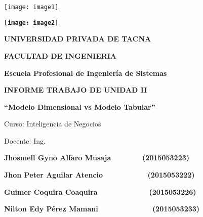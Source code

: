 \documentclass{article} %
\begin{document}


\noindent 

\noindent 

\noindent 

\noindent 

\texttt{[image: image1]}

 


\noindent \textbf{}

\noindent \textbf{\texttt{[image: image2]}}

\noindent \textbf{}

\noindent \textbf{UNIVERSIDAD PRIVADA DE TACNA}

\noindent \textbf{}

\noindent \textbf{FACULTAD DE INGENIERIA}

\noindent \textbf{\textit{}}

\noindent \textbf{Escuela Profesional de Ingenier\'{i}a de Sistemas}

\noindent \textbf{\textit{}}

\noindent \textbf{}

\noindent 

\noindent \textbf{ INFORME TRABAJO DE UNIDAD II}

\noindent \textbf{``Modelo Dimensional vs Modelo Tabular''}

\noindent \textbf{\textit{}}

\noindent \textbf{}

\noindent \textbf{ }

\noindent Curso: Inteligencia de Negocios

\noindent \textbf{\textit{}}

\noindent \textbf{}

\noindent \textbf{}

\noindent Docente: Ing. \textbf{\textit{}}

\noindent \textbf{}

\noindent \textbf{}

\noindent \textbf{Jhosmell Gyno Alfaro Musaja~ ~ ~ ~ ~(2015053223)}

\noindent \textbf{Jhon Peter Aguilar Atencio~ ~ ~ ~ ~ ~ ~(2015053222)}

\noindent \textbf{Guimer Coquira Coaquira~ ~ ~ ~ ~ ~ ~ ~(2015053226)}

\noindent \textbf{Nilton Edy P\'{e}rez Mamani~ ~ ~ ~ ~ ~ ~ ~ (2015053233)}
\end{document}
